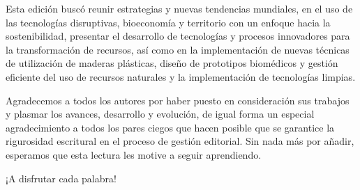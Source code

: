 Esta edición buscó reunir estrategias y nuevas tendencias mundiales, en el uso de las tecnologías disruptivas, bioeconomía y territorio con un enfoque hacia la sostenibilidad, presentar el desarrollo de tecnologías y procesos innovadores para la transformación de recursos, así como en la implementación de nuevas técnicas de utilización de maderas plásticas, diseño de prototipos biomédicos y gestión eficiente del uso de recursos naturales y la implementación de tecnologías limpias.

Agradecemos a todos los autores por haber puesto en consideración sus trabajos y plasmar los avances, desarrollo y evolución, de igual forma un especial agradecimiento a todos los pares ciegos que hacen posible que se garantice la rigurosidad escritural en el proceso de gestión editorial. Sin nada más por añadir, esperamos que esta lectura les motive a seguir aprendiendo.

¡A disfrutar cada palabra!

